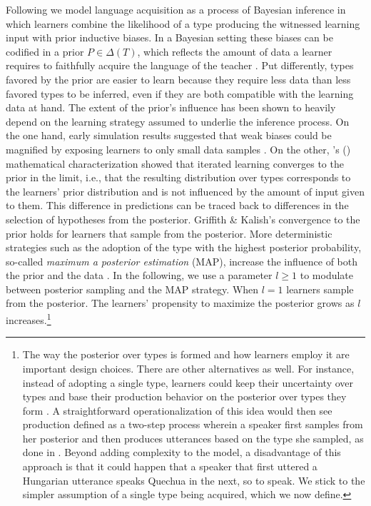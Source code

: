 \documentclass[a4paper, 11pt]{article}
\theoremstyle{Satz}
\newcommand{\citeposs}[2][]{\citeauthor{#2}'s (\citeyear[#1]{#2})}
\begin{document}
Following \citet{griffiths+kalish:2005,griffiths+kalish:2007} we model language acquisition as
a process of Bayesian inference in which learners combine the likelihood of a type producing
the witnessed learning input with prior inductive biases. In a Bayesian setting these biases
can be codified in a prior $P \in \Delta(T)$, which reflects the amount of data a learner
requires to faithfully acquire the language of the teacher
\citep[cf.][450]{griffiths+kalish:2007}. Put differently, types favored by the prior are easier
to learn because they require less data than less favored types to be inferred, even if they
are both compatible with the learning data at hand. The extent of the prior's influence has
been shown to heavily depend on the learning strategy assumed to underlie the inference
process. On the one hand, early simulation results suggested that weak biases could be
magnified by exposing learners to only small data samples \citep[e.g. in][]{brighton:2002}. On
the other, \citeposs{griffiths+kalish:2007} mathematical characterization showed that iterated
learning converges to the prior in the limit, i.e., that the resulting distribution over types
corresponds to the learners' prior distribution and is not influenced by the amount of input
given to them. This difference in predictions can be traced back to differences in the
selection of hypotheses from the posterior. Griffith \& Kalish's convergence to the prior holds
for learners that sample from the posterior. More deterministic strategies such as the adoption
of the type with the highest posterior probability, so-called {\it maximum a posterior
  estimation} (MAP), increase the influence of both the prior and the data
\citep{griffiths+kalish:2007,kirby+etal:2007}. In the following, we use a parameter $l\ge1$ to
modulate between posterior sampling and the MAP strategy. When $l = 1$ learners sample from the
posterior. The learners' propensity to maximize the posterior grows as $l$
increases.\footnote{The way the posterior over types is formed and how learners employ it are
  important design choices. There are other alternatives as well. For instance, instead of
  adopting a single type, learners could keep their uncertainty over types and base their
  production behavior on the posterior over types they form \citep{burkett+griffiths:2010}. A
  straightforward operationalization of this idea would then see production defined as a
  two-step process wherein a speaker first samples from her posterior and then produces
  utterances based on the type she sampled, as done in \citet{kirby+etal:2015}. Beyond adding
  complexity to the model, a disadvantage of this approach is that it could happen that a
  speaker that first uttered a Hungarian utterance speaks Quechua in the next, so to speak. We
  stick to the simpler assumption of a single type being acquired, which we now define.}
\end{document}
